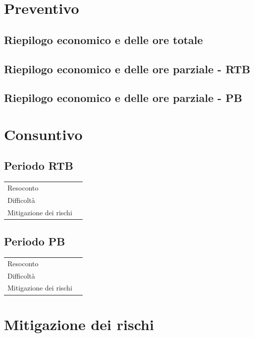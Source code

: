 \documentclass{article}
\begin{document}
\section{Preventivo}
\subsection{Riepilogo economico e delle ore totale}
\subsection{Riepilogo economico e delle ore parziale - RTB}
\subsection{Riepilogo economico e delle ore parziale - PB}

\section{Consuntivo}
\subsection{Periodo RTB}
\begin{center}
\begin{tabular}{P{10em} P{20em}} 
     Resoconto &  \\ 
    Difficoltà & \\
    Mitigazione dei rischi &  \\
\end{tabular}
\end{center}
\subsection{Periodo PB}
\begin{center}
\begin{tabular}{P{10em} P{20em}} 
     Resoconto &  \\ 
    Difficoltà & \\
    Mitigazione dei rischi &  \\
\end{tabular}
\end{center}

\section{Mitigazione dei rischi}
\end{document}
